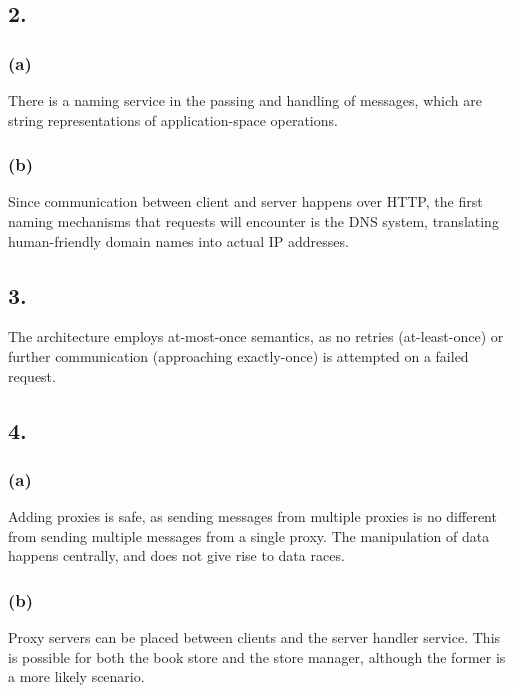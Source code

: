 \documentclass[12pt]{article}
\begin{document}
\subsection*{2.} %

\subsubsection*{(a)} %

There is a naming service in the passing and handling of messages, which are string representations of application-space operations.

\subsubsection*{(b)} %

Since communication between client and server happens over HTTP, the first naming mechanisms that requests will encounter is the DNS system, translating human-friendly domain names into actual IP addresses.

\subsection*{3.} %

The architecture employs at-most-once semantics, as no retries (at-least-once) or further communication (approaching exactly-once) is attempted on a failed request.

\subsection*{4.} %

\subsubsection*{(a)} %

Adding proxies is safe, as sending messages from multiple proxies is no different from sending multiple messages from a single proxy. The manipulation of data happens centrally, and does not give rise to data races.

\subsubsection*{(b)} %

Proxy servers can be placed between clients and the server handler service. This is possible for both the book store and the store manager, although the former is a more likely scenario.
\end{document}
